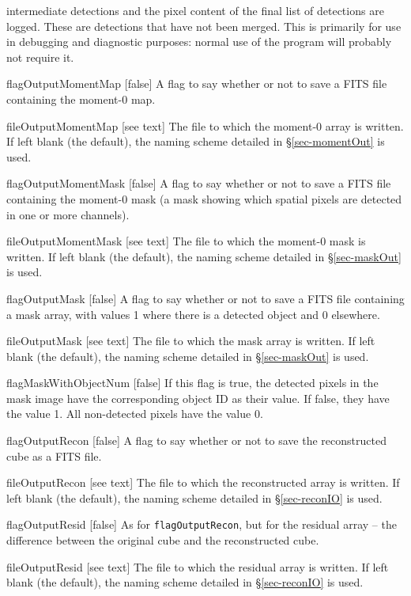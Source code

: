 \begin{Lentry}
  intermediate detections and the pixel content of the final list of
  detections are logged. These are detections that have not been
  merged. This is primarily for use in debugging and diagnostic
  purposes: normal use of the program will probably not require it.
\item[{flagOutputMomentMap [false]}] A flag to say whether or not to save a
  FITS file containing the moment-0 map. 
\item[fileOutputMomentMap{ [see text]}] The file to which the moment-0 array is
  written. If left blank (the default), the naming scheme detailed in
  \S\ref{sec-momentOut} is used.
\item[{flagOutputMomentMask [false]}] A flag to say whether or not to save a
  FITS file containing the moment-0 mask (a mask showing which spatial
  pixels are detected in one or more channels). 
\item[fileOutputMomentMask{ [see text]}] The file to which the moment-0 mask is
  written. If left blank (the default), the naming scheme detailed in
  \S\ref{sec-maskOut} is used.
\item[{flagOutputMask [false]}] A flag to say whether or not to save a
  FITS file containing a mask array, with values 1 where there is a
  detected object and 0 elsewhere. 
\item[fileOutputMask{ [see text]}] The file to which the mask array is
  written. If left blank (the default), the naming scheme detailed in
  \S\ref{sec-maskOut} is used.
\item[{flagMaskWithObjectNum [false]}] If this flag is true, the
  detected pixels in the mask image have the corresponding object ID
  as their value. If false, they have the value 1. All non-detected
  pixels have the value 0.
\item[{flagOutputRecon [false]}] A flag to say whether or not
  to save the reconstructed cube as a FITS file. 
\item[fileOutputRecon{ [see text]}] The file to which the reconstructed array
  is written. If left blank (the default), the naming scheme detailed
  in \S\ref{sec-reconIO} is used.
\item[{flagOutputResid [false]}] As for
  \texttt{flagOutputRecon}, but for the residual array -- the
  difference between the original cube and the reconstructed cube. 
\item[fileOutputResid{ [see text]}] The file to which the residual array
  is written. If left blank (the default), the naming scheme detailed
  in \S\ref{sec-reconIO} is used.

\end{Lentry}
